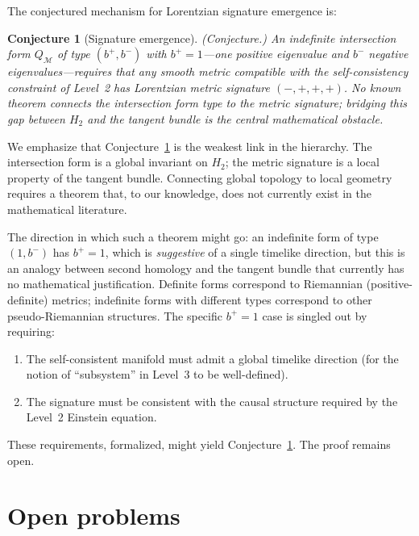 \documentclass[12pt,a4paper]{article}
\newtheorem{conjecture}{Conjecture}
\theoremstyle{definition}
\theoremstyle{remark}
\begin{document}
The conjectured mechanism for Lorentzian signature emergence is:

\begin{conjecture}[Signature emergence]
\emph{(Conjecture.)}
\label{conj:signature}
An indefinite intersection form $Q_\mathcal{M}$ of type $(b^+, b^-)$ with
$b^+ = 1$---one positive eigenvalue and $b^-$ negative eigenvalues---requires
that any smooth metric compatible with the self-consistency constraint of
Level~2 has Lorentzian metric signature $(-,+,+,+)$. No known theorem connects
the intersection form type to the metric signature; bridging this gap between
$H_2$ and the tangent bundle is the central mathematical obstacle.
\end{conjecture}

We emphasize that Conjecture~\ref{conj:signature} is the weakest link in the
hierarchy. The intersection form is a global invariant on $H_2$; the metric
signature is a local property of the tangent bundle. Connecting global topology
to local geometry requires a theorem that, to our knowledge, does not currently
exist in the mathematical literature.

The direction in which such a theorem might go: an indefinite form of type
$(1, b^-)$ has $b^+ = 1$, which is \emph{suggestive} of a single timelike
direction, but this is an analogy between second homology and the tangent
bundle that currently has no mathematical justification. Definite forms
correspond to Riemannian (positive-definite) metrics; indefinite forms with
different types correspond to other pseudo-Riemannian structures. The specific
$b^+ = 1$ case is singled out by requiring:
\begin{enumerate}
\item The self-consistent manifold must admit a global timelike direction (for
the notion of ``subsystem'' in Level~3 to be well-defined).
\item The signature must be consistent with the causal structure required by the
Level~2 Einstein equation.
\end{enumerate}
These requirements, formalized, might yield Conjecture~\ref{conj:signature}.
The proof remains open.

\section{Open problems}
\label{sec:open}
\end{document}

